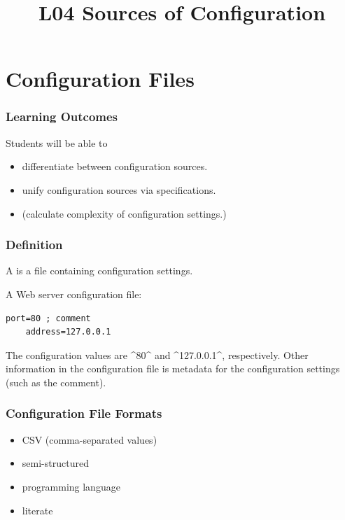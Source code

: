 


\title{L04 Sources of Configuration}



\section{Configuration Files}

\begin{frame}
	\frametitle{Learning Outcomes}
	Students will be able to
	\begin{itemize}
	\item differentiate between configuration sources.
	\item unify configuration sources via specifications.
	\item (calculate complexity of configuration settings.)
	\end{itemize}
\end{frame}

\begin{frame}[fragile]
	\frametitle{Definition}
	A  is a file containing configuration settings.

	\pause
	A Web server configuration file:

	\begin{lstlisting}[gobble=4]
	port=80 ; comment
	address=127.0.0.1\end{lstlisting}

	\pause

	The configuration values are ^80^ and ^127.0.0.1^, respectively.
	Other information in the configuration file is metadata for the configuration settings (such as the comment).
\end{frame}

\begin{frame}
	\frametitle{Configuration File Formats}
	\begin{itemize}
	\item CSV (comma-separated values)
	\item semi-structured
	\item programming language
	\item literate
	\end{itemize}
\end{frame}

